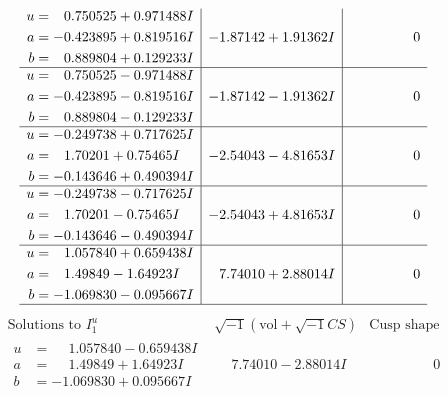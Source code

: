 \documentclass[1p]{elsarticle_modified}
\theoremstyle{definition}
\newcommand{\I}{\sqrt{-1}}
\begin{document}
$$\begin{array}{c|c|c}
\begin{aligned}
u &= \phantom{-}0.750525 + 0.971488 I \\
a &= -0.423895 + 0.819516 I \\
b &= \phantom{-}0.889804 + 0.129233 I\end{aligned}
 & -1.87142 + 1.91362 I & \phantom{-0.000000 } 0 \\ \hline\begin{aligned}
u &= \phantom{-}0.750525 - 0.971488 I \\
a &= -0.423895 - 0.819516 I \\
b &= \phantom{-}0.889804 - 0.129233 I\end{aligned}
 & -1.87142 - 1.91362 I & \phantom{-0.000000 } 0 \\ \hline\begin{aligned}
u &= -0.249738 + 0.717625 I \\
a &= \phantom{-}1.70201 + 0.75465 I \\
b &= -0.143646 + 0.490394 I\end{aligned}
 & -2.54043 - 4.81653 I & \phantom{-0.000000 } 0 \\ \hline\begin{aligned}
u &= -0.249738 - 0.717625 I \\
a &= \phantom{-}1.70201 - 0.75465 I \\
b &= -0.143646 - 0.490394 I\end{aligned}
 & -2.54043 + 4.81653 I & \phantom{-0.000000 } 0 \\ \hline\begin{aligned}
u &= \phantom{-}1.057840 + 0.659438 I \\
a &= \phantom{-}1.49849 - 1.64923 I \\
b &= -1.069830 - 0.095667 I\end{aligned}
 & \phantom{-}7.74010 + 2.88014 I & \phantom{-0.000000 } 0\\
 \hline 
 \end{array}$$\newpage$$\begin{array}{c|c|c}  
\text{Solutions to }I^u_{1}& \I (\text{vol} + \sqrt{-1}CS) & \text{Cusp shape}\\
 \hline 
\begin{aligned}
u &= \phantom{-}1.057840 - 0.659438 I \\
a &= \phantom{-}1.49849 + 1.64923 I \\
b &= -1.069830 + 0.095667 I\end{aligned}
 & \phantom{-}7.74010 - 2.88014 I & \phantom{-0.000000 } 0 \\ \hline\begin{aligned}

\end{aligned}
\end{array}$$
\end{document}

